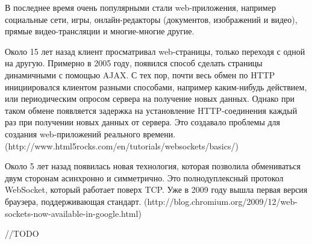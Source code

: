 \intro
В последнее время очень популярными стали web-приложения, например социальные сети, игры, онлайн-редакторы (документов, изображений и видео), прямые видео-трансляции и многие-многие другие.

Около 15 лет назад клиент просматривал web-страницы, только переходя с одной на другую. Примерно в 2005 году, появился способ сделать страницы динамичными с помощью AJAX. С тех пор, почти весь обмен по HTTP инициировался клиентом разными способами, например каким-нибудь действием, или периодическим опросом сервера на получение новых данных. Однако при таком обмене появляется задержка на установление HTTP-соединения каждый раз при получении новых данных от сервера. Это создавало проблемы для создания web-приложений реального времени.(http://www.html5rocks.com/en/tutorials/websockets/basics/)

Около 5 лет назад появилась новая технология, которая позволила обмениваться двум сторонам асинхронно и симметрично. Это полнодуплексный протокол WebSocket, который работает поверх TCP. Уже в 2009 году вышла первая версия браузера, поддерживающая стандарт. (http://blog.chromium.org/2009/12/web-sockets-now-available-in-google.html)

//TODO